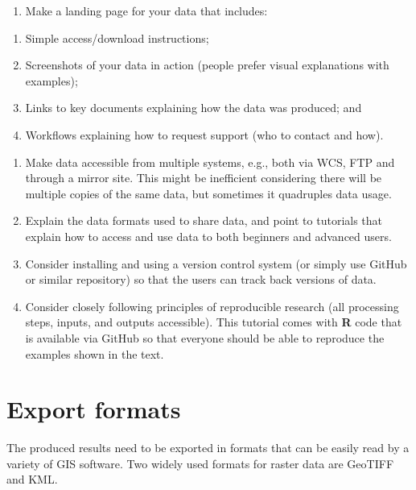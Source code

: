 \documentclass[10pt,b5paper,]{book}
\providecommand{\tightlist}{%
  \setlength{\itemsep}{0pt}\setlength{\parskip}{0pt}}
\theoremstyle{definition}
\theoremstyle{definition}
\theoremstyle{definition}
\theoremstyle{remark}
\begin{document}
\begin{enumerate}
\def\labelenumi{\arabic{enumi}.}
\tightlist
\item
  Make a landing page for your data that includes:
\end{enumerate}

\begin{enumerate}
\def\labelenumi{\alph{enumi}.}
\tightlist
\item
  Simple access/download instructions;
\item
  Screenshots of your data in action (people prefer visual explanations
  with examples);
\item
  Links to key documents explaining how the data was produced; and
\item
  Workflows explaining how to request support (who to contact and how).
\end{enumerate}

\begin{enumerate}
\def\labelenumi{\arabic{enumi}.}
\setcounter{enumi}{1}
\tightlist
\item
  Make data accessible from multiple systems, e.g., both via WCS, FTP
  and through a mirror site. This might be inefficient considering there
  will be multiple copies of the same data, but sometimes it quadruples
  data usage.
\item
  Explain the data formats used to share data, and point to tutorials
  that explain how to access and use data to both beginners and advanced
  users.
\item
  Consider installing and using a version control system (or simply use
  GitHub or similar repository) so that the users can track back
  versions of data.
\item
  Consider closely following principles of reproducible research (all
  processing steps, inputs, and outputs accessible). This tutorial comes
  with \textbf{R} code that is available via GitHub so that everyone
  should be able to reproduce the examples shown in the text.
\end{enumerate}

\hypertarget{export-formats-1}{%
\section{Export formats}\label{export-formats-1}}

The produced results need to be exported in formats that can be easily
read by a variety of GIS software. Two widely used formats for raster
data are GeoTIFF and KML.
\end{document}
